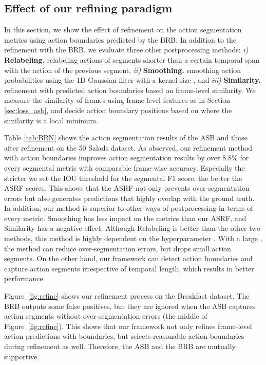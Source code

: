 \documentclass[10pt,twocolumn,letterpaper]{article}
\begin{document}
\subsection{Effect of our refining paradigm}
\label{sec:impact_asrf}
In this section, we show the effect of refinement on the action segmentation metrics using action boundaries predicted by the BRB.
In addition to the refinement with the BRB, we evaluate three other postprocessing methods:
\textit{i)} \textbf{Relabeling.} relabeling actions of segments shorter than a certain temporal span  with the action of the previous segment,
\textit{ii)} \textbf{Smoothing.} smoothing action probabilities using the 1D Gaussian filter with a kernel size , and
\textit{iii)} \textbf{Similarity.} refinement with predicted action boundaries based on frame-level similarity.
We measure the similarity of frames using frame-level features as in Section \ref{sec:loss_asb},
and decide action boundary positions based on where the similarity is a local minimum. 

Table \ref{tab:BRN} shows the action segmentation results of the ASB and those after refinement on the 50 Salads dataset.
As observed, our refinement method with action boundaries improves action segmentation results by over 8.8\% for every segmental metric with comparable frame-wise accuracy.
Especially the stricter we set the IOU threshold for the segmental F1 score, the better the ASRF scores.
This shows that the ASRF not only prevents over-segmentation errors but also generates predictions that highly overlap with the ground truth.
In addition, our method is superior to other ways of postprocessing in terms of every metric.
Smoothing has less impact on the metrics than our ASRF, and Similarity has a negative effect.
Although Relabeling is better than the other two methods, this method is highly dependent on the hyperparameter .
With a large , the method can reduce over-segmentation errors, but drops small action segments.
On the other hand, our framework can detect action boundaries and capture action segments irrespective of temporal length, which results in better performance.

Figure~\ref{fig:refine} shows our refinement process on the Breakfast dataset.
The BRB outputs some false positives, but they are ignored when the ASB captures action segments without over-segmentation errors (the middle of Figure~\ref{fig:refine}).
This shows that our framework not only refines frame-level action predictions with boundaries,
but selects reasonable action boundaries during refinement as well. 
Therefore, the ASB and the BRB are mutually supportive.
\end{document}
